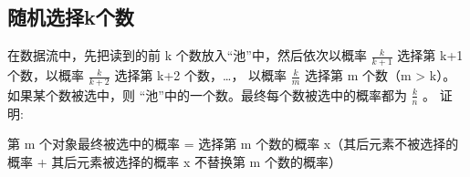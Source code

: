 \documentclass[letterpaper,10pt,english]{sphinxmanual}
\begin{document}
\begin{sphinxVerbatim}[commandchars=\\\{\},numbers=left,firstnumber=1,stepnumber=1]
     
    
   
               
         
          
   
\end{sphinxVerbatim}


\subsection{随机选择k个数}
\label{\detokenize{mathematicsAlgorithm/06_randomSample:k}}
在数据流中，先把读到的前 k 个数放入“池”中，然后依次以概率 \(\frac{k}{k+1}\) 选择第 k+1 个数，以概率 \(\frac{k}{k+2}\) 选择第 k+2 个数，…，
以概率 \(\frac{k}{m}\) 选择第 m 个数（m \textgreater{} k）。如果某个数被选中，则  “池”中的一个数。最终每个数被选中的概率都为 \(\frac{k}{n}\) 。
证明:

%
\begin{sphinxVerbatim}[commandchars=\\\{\}]
第 m 个对象最终被选中的概率 = 选择第 m 个数的概率 x（其后元素不被选择的概率 + 其后元素被选择的概率 x 不替换第 m 个数的概率）
\end{sphinxVerbatim}
\end{document}
